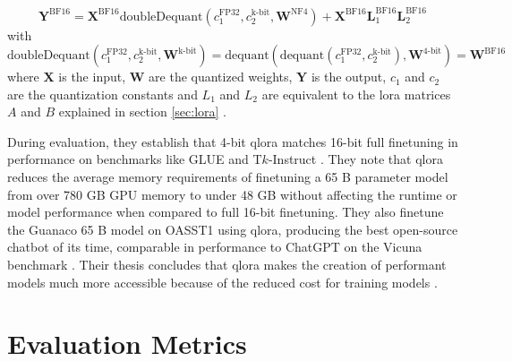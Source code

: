 \begin{equation}
    \mathbf{Y}^{\text{BF16}} = \mathbf{X}^{\text{BF16}} \text{doubleDequant} (c_1^{\text{FP32}},c_2^{\text{k-bit}},\textbf{W}^{\text{NF4}}) + \mathbf{X}^{\text{BF16}} \mathbf{L}_1^{\text{BF16}} \mathbf{L}_2^{\text{BF16}}
\end{equation}
with
\begin{equation}
    \text{doubleDequant} (c_1^{\text{FP32}},c_2^{\text{k-bit}},\textbf{W}^{\text{k-bit}}) = \text{dequant}(\text{dequant}(c_1^{\text{FP32}},c_2^{\text{k-bit}}), \textbf{W}^{\text{4-bit}}) = \textbf{W}^{\text{BF16}}
\end{equation}
where $\mathbf{X}$ is the input, $\mathbf{W}$ are the quantized weights, $\mathbf{Y}$ is the output, $c_1$ and $c_2$ are the quantization constants and $L_1$ and $L_2$ are equivalent to the \ac{lora} matrices $A$ and $B$ explained in section \ref{sec:lora} \cite{Dettmers.2023}.

During evaluation, they establish that 4-bit \ac{qlora} matches 16-bit full finetuning in performance on benchmarks like GLUE \cite{Wang.2018} and T$k$-Instruct \cite{Wang.2022}.
They note that \ac{qlora} reduces the average memory requirements of finetuning a 65 B parameter model from over 780 GB GPU memory to under 48 GB without affecting the runtime or model performance when compared to full 16-bit finetuning.
They also finetune the Guanaco 65 B model on OASST1 using \ac{qlora}, producing the best open-source chatbot of its time, comparable in performance to ChatGPT on the Vicuna benchmark \cite{Chiang.2023}.
Their thesis concludes that \ac{qlora} makes the creation of performant models much more accessible because of the reduced cost for training models \cite{Dettmers.2023}.


\section{Evaluation Metrics}
\label{sec:metrics}

